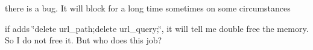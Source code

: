 
\begin{DoxyRefList}
\item[\label{de/da5/bug__bug000001}%
\hypertarget{de/da5/bug__bug000001}{}%
\-Member \hyperlink{classSQSMaster_ac844442974f57fe16ab8ccdcffb7c0af}{\-S\-Q\-S\-Master\-:\-:dispatch\-Message} (std\-::string remote\-Node, int remote\-Port, std\-::string request)]there is a bug. \-It will block for a long time sometimes on some circumstances  
\item[\label{de/da5/bug__bug000002}%
\hypertarget{de/da5/bug__bug000002}{}%
\-Member \hyperlink{classSQSMaster_a15fe36fa592546e0740e91bff9972fc2}{\-S\-Q\-S\-Master\-:\-:on\-Data\-Node\-Recv} (struct evhttp\-\_\-request $\ast$req)]if adds \char`\"{}delete url\-\_\-path;delete url\-\_\-query;\char`\"{}, it will tell me double free the memory. \-So \-I do not free it. \-But who does this job? 
\end{DoxyRefList}